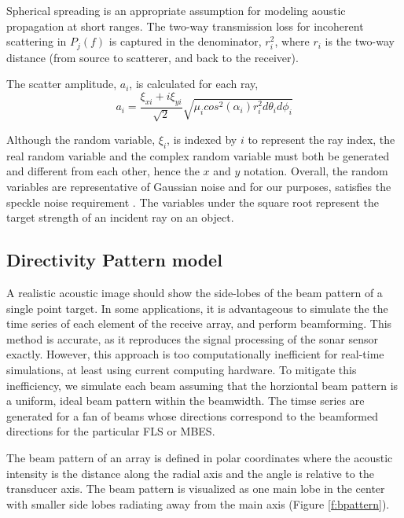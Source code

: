 \documentclass[utf8]{frontiersSCNS} %
\begin{document}
Spherical spreading is an appropriate assumption for modeling aoustic propagation at short ranges. The two-way transmission loss for incoherent scattering in $P_j(f)$ is captured in the denominator, $r_i^2$, where $r_i$ is the two-way distance (from source to scatterer, and back to the receiver).

The scatter amplitude, $a_i$, is calculated for each ray,
\begin{equation}
    a_i = \frac{\xi_{xi} + i \xi_{yi}}{\sqrt{2}}\sqrt{\mu_i cos^2(\alpha_i)r_i^2d\theta_id\phi_i}
\end{equation}

Although the random variable, $\xi_i$, is indexed by $i$ to represent the ray index, the real random variable and the complex random variable must both be generated and different from each other, hence the $x$ and $y$ notation. Overall, the random variables are representative of Gaussian noise and for our purposes, satisfies the speckle noise requirement \citep{brown17point}. The variables under the square root represent the target strength of an incident ray on an object.

\subsection{Directivity Pattern model}
\label{s:beampattern}
A realistic acoustic image should show the side-lobes of the beam pattern of a single point target. In some applications, it is advantageous to simulate the the time series of each element of the receive array, and perform beamforming. This method is accurate, as it reproduces the signal processing of the sonar sensor exactly. However, this approach is too computationally inefficient for real-time simulations, at least using current computing hardware. To mitigate this inefficiency, we simulate each beam assuming that the horziontal beam pattern is a uniform, ideal beam pattern within the beamwidth. The timse series are generated for a fan of beams whose directions correspond to the beamformed directions for the particular FLS or MBES.

The beam pattern of an array is defined in polar coordinates where the acoustic intensity is the distance along the radial axis and the angle is relative to the transducer axis. The beam pattern is visualized as one main lobe in the center with smaller side lobes radiating away from the main axis (Figure \ref{f:bpattern}). 
\end{document}
